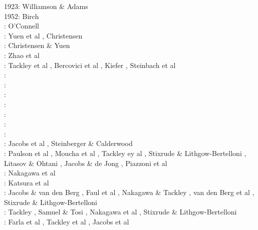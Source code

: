 \begin{scriptsize}
1923: Williamson \& Adams \cite{wiad23}\\
1952: Birch \cite{birc52}\\
\nineteenseventysix: O'Connell \cite{ocon76}\\
\nineteeneightytwo: Yuen et al \cite{yusb82}, Christensen \cite{chri82}\\
\nineteeneightyfive: Christensen \& Yuen \cite{chyu85}\\
\nineteenninetytwo: Zhao et al \cite{zhyh92}\\
\nineteenninetythree: Tackley et al \cite{tasg93}, Bercovici et al \cite{best93}, Kiefer \cite{kief93},
Steinbach et al \cite{styz93}\\
\nineteenninetyfour: \cite{vayv94}\cite{zhgu94b}\cite{styu94}\\
\nineteenninetyfive: \cite{zhyu95}\cite{chri95}\cite{scta95}\cite{tack95}\\
\nineteenninetysix: \cite{pelt96}\cite{mitr96}\cite{tack96b}\\
\nineteenninetyseven: \cite{mifo97}\cite{pebs97}\\
\nineteenninetyeight: \cite{cava98}\cite{kenn98}\\
\nineteenninetynine: \cite{sigh99}\cite{kehv99}\cite{vaka99}\\
\twothousandfive: \cite{hett05}\cite{nata05b}\cite{nabu05}\cite{stli05}\cite{stli05b}\\
\twothousandsix: Jacobs et al \cite{javd06}, Steinberger \& Calderwood \cite{stca06}\\
\twothousandseven: Paulson et al \cite{pazw07}, Moucha et al \cite{mofm07}, Tackley ey al \cite{tanh07}, 
Stixrude \& Lithgow-Bertelloni \cite{stli07}, Litasov \& Ohtani \cite{lioh07}, Jacobs \& de Jong \cite{jade07},
Piazzoni et al \cite{pisb07}\\
\twothousandnine: Nakagawa et al \cite{natd09}\\
\twothousandten: Katsura et al \cite{kayy10}\\
\twothousandeleven: Jacobs \& van den Berg \cite{java11}, Faul et al \cite{faff11}, Nakagawa \& Tackley \cite{nata11}, 
van den Berg et al \cite{vayj11}, Stixrude \& Lithgow-Bertelloni \cite{stli11}\\
\twothousandtwelve: Tackley \cite{tack12}, Samuel \& Tosi \cite{sato12}, Nakagawa et al \cite{natd12}, Stixrude \& Lithgow-Bertelloni \cite{stli12}\\
\twothousandthirteen: Farla et al \cite{fakc13}, Tackley et al \cite{taab13}, Jacobs et al \cite{jasv13}\\

\end{scriptsize}
